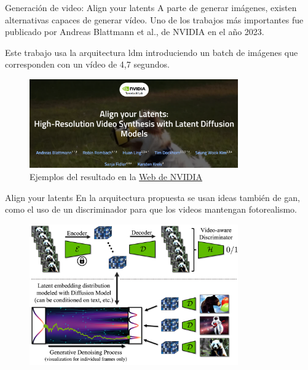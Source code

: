 \begin{frame}{Generación de video: Align your latents}
A parte de generar imágenes, existen alternativas capaces de generar vídeo. Uno de los trabajos más importantes fue publicado por Andreas Blattmann et al., de NVIDIA \cite{blattmann2023align} en el año 2023.

Este trabajo usa la arquitectura \gls{ldm} introduciendo un \alert{batch de imágenes} que corresponden con un vídeo de 4,7 segundos.

\begin{figure}
    \centering
    \includegraphics[width=0.8\textwidth]{figures/Diffusion_Models/AlignYourLatent_NVIDIA.png}
    \caption{Ejemplos del resultado en la \href{https://research.nvidia.com/labs/toronto-ai/VideoLDM/samples.html}{\alert{Web de NVIDIA}}}
\end{figure}
\end{frame}

\begin{frame}{Align your latents}
En la arquitectura propuesta se usan ideas también de \gls{gan}, como el uso de un \alert{discriminador} para que los videos mantengan fotorealismo.

\begin{figure}
    \centering
    \includegraphics[width=0.8\textwidth]{figures/Diffusion_Models/AlignYourLatent.png}
    \caption{\cite{blattmann2023align}}
\end{figure}
\end{frame}

